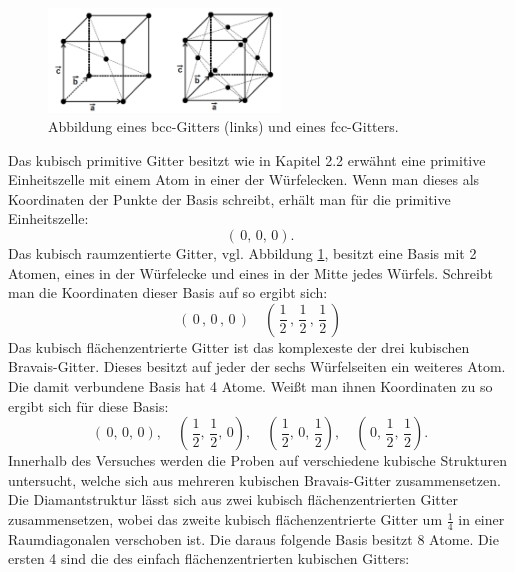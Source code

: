 \begin{figure}
    \centering
    \includegraphics[width=0.55\textwidth]{ressources/kubies.png}
    \caption{Abbildung eines bcc-Gitters (links) und eines fcc-Gitters\cite{skript}.}
    \label{bcc}
\end{figure}

Das kubisch primitive Gitter besitzt wie in Kapitel 2.2 erwähnt eine
primitive Einheitszelle mit einem Atom in einer der Würfelecken.
Wenn man dieses als Koordinaten der Punkte der Basis
schreibt, erhält man für die primitive Einheitszelle:
$$ (\,0,\,0,\,0).$$
Das kubisch raumzentierte Gitter, vgl. Abbildung \ref{bcc}, besitzt eine Basis mit 2 Atomen,
eines in der Würfelecke und eines in der Mitte jedes Würfels. Schreibt man
die Koordinaten dieser Basis auf so ergibt sich:
$$(\,0\,,\,0\,,\,0\,) \quad (\,\frac{1}{2}\,, \,\frac{1}{2}\, ,\, \frac{1}{2}\,)$$
Das kubisch flächenzentrierte Gitter ist das komplexeste der drei kubischen Bravais-Gitter.
Dieses besitzt auf jeder der sechs Würfelseiten ein weiteres Atom. Die damit
verbundene Basis hat 4 Atome. Weißt man ihnen Koordinaten zu so ergibt sich
für diese Basis:
$$(\,0,\,0,\,0), \quad (\,\frac{1}{2},\, \frac{1}{2} ,\, 0), \quad (\, \frac{1}{2}, \,0 ,\, \frac{1}{2}),
\quad (\,0, \, \frac{1}{2} , \, \frac{1}{2}).$$
Innerhalb des Versuches werden die Proben auf verschiedene kubische Strukturen
untersucht, welche sich aus mehreren kubischen Bravais-Gitter zusammensetzen.
Die Diamantstruktur lässt sich aus zwei kubisch flächenzentrierten Gitter
zusammensetzen, wobei das zweite kubisch flächenzentrierte Gitter um
$\frac{1}{4}$ in einer Raumdiagonalen verschoben ist. Die daraus folgende
Basis besitzt 8 Atome. Die ersten 4 sind die des einfach flächenzentrierten
kubischen Gitters:

